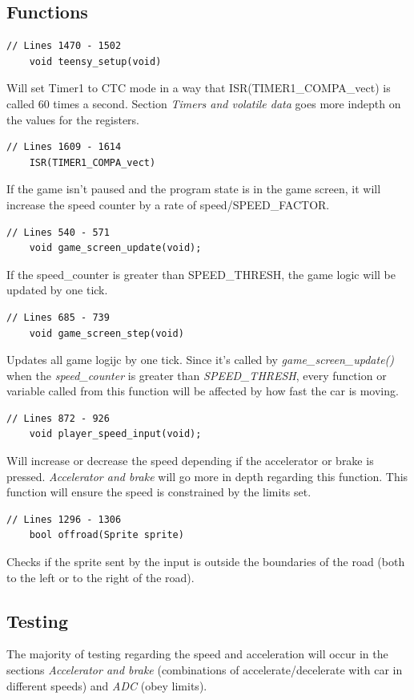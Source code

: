 \documentclass{article}
\begin{document}
\subsection*{Functions}
\begin{lstlisting}[style=CStyle]
	// Lines 1470 - 1502
	void teensy_setup(void)
\end{lstlisting}
Will set Timer1 to CTC mode in a way that ISR(TIMER1\_COMPA\_vect) is called 60 times a second. Section \emph{Timers and volatile data} goes more indepth on the values for the registers. 
\begin{lstlisting}[style=CStyle]
	// Lines 1609 - 1614
	ISR(TIMER1_COMPA_vect)
\end{lstlisting}
If the game isn't paused and the program state is in the game screen, it will increase the speed counter by a rate of speed/SPEED\_FACTOR.
\begin{lstlisting}[style=CStyle]
	// Lines 540 - 571
	void game_screen_update(void);
\end{lstlisting}
If the speed\_counter is greater than SPEED\_THRESH, the game logic will be updated by one tick. 
\newpage
\begin{lstlisting}[style=CStyle]
	// Lines 685 - 739
	void game_screen_step(void)
\end{lstlisting}
Updates all game logijc by one tick. Since it's called by \emph{game\_screen\_update()} when the \emph{speed\_counter} is greater than \emph{SPEED\_THRESH}, every function or variable called from this function will be affected by how fast the car is moving.
\begin{lstlisting}[style=CStyle]
	// Lines 872 - 926
	void player_speed_input(void);
\end{lstlisting}
Will increase or decrease the speed depending if the accelerator or brake is pressed. \emph{Accelerator and brake} will go more in depth regarding this function. This function will ensure the speed is constrained by the limits set.
\begin{lstlisting}[style=CStyle]
	// Lines 1296 - 1306
	bool offroad(Sprite sprite)
\end{lstlisting}
Checks if the sprite sent by the input is outside the boundaries of the road (both to the left or to the right of the road).
\newline

\subsection*{Testing}
The majority of testing regarding the speed and acceleration will occur in the sections \emph{Accelerator and brake} (combinations of accelerate/decelerate with car in different speeds) and \emph{ADC} (obey limits). 
\end{document}
